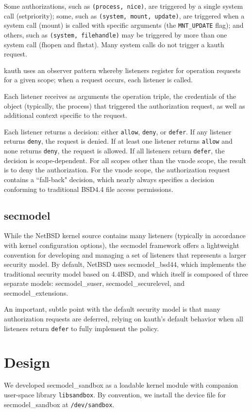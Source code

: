 \documentclass[letterpaper,twocolumn,9pt]{article}
\begin{document}
Some authorizations, such as \texttt{(process, nice)}, are triggered by a single
system call (setpriority); some, such as \texttt{(system, mount, update)}, are
triggered when a system call (mount) is called with specific arguments (the
\texttt{MNT\_UPDATE} flag); and others, such as \texttt{(system, filehandle)}
may be triggered by more than one system call (fhopen and fhstat).  Many system
calls do not trigger a kauth request.

kauth uses an observer pattern whereby listeners register for operation
requests for a given scope; when a request occurs, each listener is called.

Each listener receives as arguments the operation triple, the
credentials of the object (typically, the process) that triggered the
authorization request, as well as additional context specific to the
request.

Each listener returns a decision: either \texttt{allow},  \texttt{deny}, or
\texttt{defer}.  If any listener returns \texttt{deny}, the request is denied.
If at least one listener returns \texttt{allow} and none returns \texttt{deny},
the request is allowed.  If all listeners return \texttt{defer}, the decision
is scope-dependent.  For all scopes other than the vnode scope, the result is
to deny the authorization.  For the vnode scope, the authorization request
contains a ``fall-back" decision, which nearly always specifies a decision
conforming to traditional BSD4.4 file access permissions.

\subsection{secmodel}
While the NetBSD kernel source contains many listeners (typically in accordance
with kernel configuration options), the secmodel framework offers a lightweight
convention for developing and managing a set of listeners that represents a
larger security model.  By default, NetBSD uses secmodel\_bsd44, which
implements the traditional security model based on 4.4BSD, and which itself is
composed of three separate models: secmodel\_suser, secmodel\_securelevel, and
secmodel\_extensions.

An important, subtle point with the default security model is that many
authorization requests are deferred, relying on kauth's default behavior when
all listeners return \texttt{defer} to fully implement the policy.  

\section{Design}
We developed secmodel\_sandbox as a loadable kernel module with companion
user-space library \texttt{libsandbox}.  By convention, we install the device
file for secmodel\_sandbox at \texttt{/dev/sandbox}.
\end{document}
